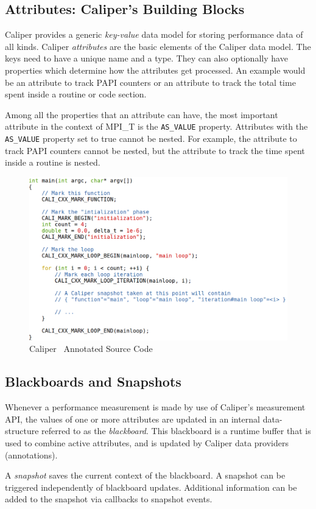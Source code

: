 \subsection{Attributes: Caliper's Building Blocks}
Caliper provides a generic \textit{key-value} data model for storing performance data of all kinds. Caliper \textit{attributes} are the basic elements of the Caliper data model. The keys need to have a unique name and a type. They can also optionally have properties which determine how the attributes get processed. An example would be an attribute to track PAPI counters or an attribute to track the total time spent inside a routine or code section. 
\par Among all the properties that an attribute can have, the most important attribute in the context of MPI\_T is the \verb+AS_VALUE+ property. Attributes with the \verb+AS_VALUE+ property set to true cannot be nested. For example, the attribute to track PAPI counters cannot be nested, but the attribute to track the time spent inside a routine is nested.
\begin{center}
	\begin{figure}[tbp!]
         \centering
		\includegraphics[scale=0.3, width=\columnwidth, keepaspectratio]{figures/cali-example}
		\caption{Caliper~\cite{CALIPER} Annotated Source Code}
		\label{fig:caliexample}
	\end{figure}
\end{center}
\subsection{Blackboards and Snapshots}
Whenever a performance measurement is made by use of Caliper's measurement API, the values of one or more attributes are updated in an internal data-structure referred to as the \textit{blackboard}. This blackboard is a runtime buffer that is used to combine active attributes, and is updated by Caliper data providers (annotations).
\par A \textit{snapshot} saves the current context of the blackboard. A snapshot can be triggered independently of blackboard updates. Additional information can be added to the snapshot via callbacks to snapshot events. 

